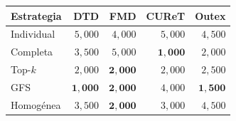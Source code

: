 \begin{resulttable}
\centering\fontsize{9}{11}\selectfont\setlength{\tabcolsep}{3.6pt}
\caption{Rankings medios por dataset según Friedman, calculados sobre macro-F1 para las cinco estrategias y 21 descriptores.}
\label{tab:rank-dataset-friedman}
\begin{tabular}{@{}lrrrr@{}}
\toprule
Estrategia & DTD & FMD & CUReT & Outex \\
\midrule
Individual & $5{,}000$ & $4{,}000$ & $5{,}000$ & $4{,}500$ \\
Completa & $3{,}500$ & $5{,}000$ & $\mathbf{1{,}000}$ & $2{,}000$ \\
Top-$k$ & $2{,}000$ & $\mathbf{2{,}000}$ & $2{,}000$ & $2{,}500$ \\
GFS & $\mathbf{1{,}000}$ & $\mathbf{2{,}000}$ & $4{,}000$ & $\mathbf{1{,}500}$ \\
Homogénea & $3{,}500$ & $\mathbf{2{,}000}$ & $3{,}000$ & $4{,}500$ \\
\bottomrule
\end{tabular}
\par{}
\end{resulttable}
\FloatBarrier
